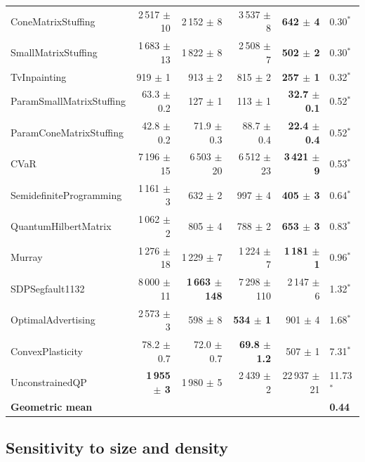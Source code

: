 \documentclass[letterpaper,12pt]{article}
\begin{document}
\begin{table}[htbp]
{\begin{tabular}{l r r r r l}
ConeMatrixStuffing          & 2\,517 $\pm$ 10 & 2\,152 $\pm$ 8 & 3\,537 $\pm$ 8 & \textbf{642 $\pm$ 4} & 0.30$^{*}$ \\
SmallMatrixStuffing         & 1\,683 $\pm$ 13 & 1\,822 $\pm$ 8 & 2\,508 $\pm$ 7 & \textbf{502 $\pm$ 2} & 0.30$^{*}$ \\
TvInpainting                & 919 $\pm$ 1 & 913 $\pm$ 2 & 815 $\pm$ 2 & \textbf{257 $\pm$ 1} & 0.32$^{*}$ \\
ParamSmallMatrixStuffing    & 63.3 $\pm$ 0.2 & 127 $\pm$ 1 & 113 $\pm$ 1 & \textbf{32.7 $\pm$ 0.1} & 0.52$^{*}$ \\
ParamConeMatrixStuffing     & 42.8 $\pm$ 0.2 & 71.9 $\pm$ 0.3 & 88.7 $\pm$ 0.4 & \textbf{22.4 $\pm$ 0.4} & 0.52$^{*}$ \\
CVaR                        & 7\,196 $\pm$ 15 & 6\,503 $\pm$ 20 & 6\,512 $\pm$ 23 & \textbf{3\,421 $\pm$ 9} & 0.53$^{*}$ \\
SemidefiniteProgramming     & 1\,161 $\pm$ 3 & 632 $\pm$ 2 & 997 $\pm$ 4 & \textbf{405 $\pm$ 3} & 0.64$^{*}$ \\
QuantumHilbertMatrix        & 1\,062 $\pm$ 2 & 805 $\pm$ 4 & 788 $\pm$ 2 & \textbf{653 $\pm$ 3} & 0.83$^{*}$ \\
Murray                      & 1\,276 $\pm$ 18 & 1\,229 $\pm$ 7 & 1\,224 $\pm$ 7 & \textbf{1\,181 $\pm$ 1} & 0.96$^{*}$ \\
SDPSegfault1132             & 8\,000 $\pm$ 11 & \textbf{1\,663 $\pm$ 148} & 7\,298 $\pm$ 110 & 2\,147 $\pm$ 6 & 1.32$^{*}$ \\
OptimalAdvertising          & 2\,573 $\pm$ 3 & 598 $\pm$ 8 & \textbf{534 $\pm$ 1} & 901 $\pm$ 4 & 1.68$^{*}$ \\
ConvexPlasticity            & 78.2 $\pm$ 0.7 & 72.0 $\pm$ 0.7 & \textbf{69.8 $\pm$ 1.2} & 507 $\pm$ 1 & 7.31$^{*}$ \\
UnconstrainedQP             & \textbf{1\,955 $\pm$ 3} & 1\,980 $\pm$ 5 & 2\,439 $\pm$ 2 & 22\,937 $\pm$ 21 & 11.73$^{*}$ \\
\midrule
\textbf{Geometric mean} & & & & & \textbf{0.44} \\
\bottomrule
\end{tabular}}
\end{table}

\subsection{Sensitivity to size and density}\label{sec:res-sensitivity}
\end{document}

